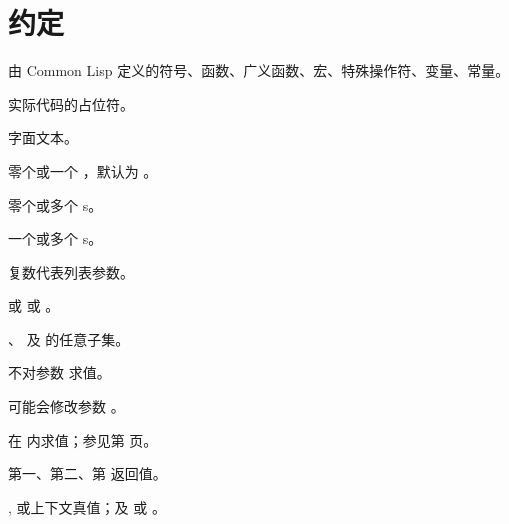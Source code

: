 %
%
\section*{约定}

\begin{LIST}{1cm}

  {
  由 Common Lisp 定义的符号、函数、广义函数、宏、特殊操作符、变量、常量。
  }

  {
  实际代码的占位符。
  }

  {
  字面文本。
  }

  {
  零个或一个 ，默认为 。
  }

  {
  零个或多个 s。
  }

  {
  一个或多个 s。
  }

  {
  复数代表列表参数。
  }

  {
   或  或 。
  }

  {
  、 及  的任意子集。
  }

  {
  不对参数  求值。
  }

  {
  可能会修改参数 。
  }

  {
   在  内求值；参见第 \pageref{:progn} 页。
  }

  {
  第一、第二、第  返回值。
  }

  \IT{\T; \NIL\qquad\qquad\qquad}
  {
  , 或上下文真值；及  或 \kwd{()}。
  }
  
\end{LIST}

